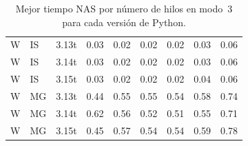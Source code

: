 \begin{table}[htbp]
{\begin{tabular}{lllrrrrrr}
W & IS & 3.13t & 0.03 & 0.02 & 0.02 & 0.02 & 0.03 & 0.06 \\
W & IS & 3.14t & 0.03 & 0.02 & 0.02 & 0.02 & 0.03 & 0.06 \\
W & IS & 3.15t & 0.03 & 0.02 & 0.02 & 0.02 & 0.04 & 0.06 \\
W & MG & 3.13t & 0.44 & 0.55 & 0.55 & 0.54 & 0.58 & 0.74 \\
W & MG & 3.14t & 0.62 & 0.56 & 0.52 & 0.51 & 0.55 & 0.71 \\
W & MG & 3.15t & 0.45 & 0.57 & 0.54 & 0.54 & 0.59 & 0.78 \\
\hline
\end{tabular}
}
\caption{Mejor tiempo NAS por número de hilos en modo~3 para cada versión de Python.}
\label{tab:versiones-mode3-tiempos-completos}
\end{table}
